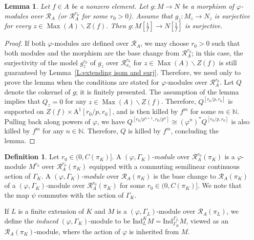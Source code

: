\documentclass[12pt]{article}
\newtheorem{lemma}[theorem]{Lemma}
\theoremstyle{definition}
\newtheorem{defn}[theorem]{Definition}
\numberwithin{equation}{theorem}
\newcommand{\calR}{\mathcal{R}}
\newcommand{\NN}{\mathbb{N}}
\newcommand{\rmA}{\mathrm{A}}
\newcommand{\Ind}{\mathrm{Ind}}
\DeclareMathOperator{\Max}{Max}
\begin{document}
\begin{lemma}
\label{L:local saturation=>global saturation}
Let $f \in A$ be a nonzero element.
Let $g: M \to N$ be a morphism of  $\varphi$-modules over $\calR_A$ (or $\calR_A^{r_0}$ for some $r_0>0$).  Assume that $g_z: M_z \to N_z$ is surjective for every $z \in \Max(A) \backslash Z(f)$.  Then $g:M[\frac 1f] \to N[\frac 1f]$ is surjective.
\end{lemma}
\begin{proof}
If both  $\varphi$-modules are defined over $\calR_A$, we may choose $r_0>0$ such that both modules and the morphism are the base change from $\calR_A^{r_0}$; in this case, the surjectivity of the model $g^{r_0}_z$ of $g_z$ over $\calR^{r_0}_{\kappa_z}$ for $z \in \Max(A)\backslash Z(f)$ is still guaranteed by Lemma~\ref{L:extending isom and surj}.  Therefore, we need only to prove the lemma when the conditions are stated for  $\varphi$-modules over $\calR_A^{r_0}$.
Let $Q$ denote the cokernel of $g$; it is finitely presented.  The assumption of the lemma implies that $Q_z=0$ for any $z \in \Max(A)\backslash Z(f)$. Therefore, $Q^{[r_0/p,r_0]}$ is supported on $Z(f) \times \rmA^1[r_0/p,r_0]$, and  is then killed by $f^m$ for some $m\in \NN$.  Pulling back along powers of $\varphi$, we have $Q^{[r_0/p^{n+1}, r_0/p^n]} \cong (\varphi^n)^* Q^{[r_0/p,r_0]}$ is also killed by $f^m$ for any $n \in \NN$.  Therefore, $Q$ is killed by $f^m$, concluding the lemma.
\end{proof}



\begin{defn}\label{D:phigammamodule}
Let $r_0 \in (0, C(\pi_K)]$.  A \emph{$(\varphi, \Gamma_K)$-module}
  over $\calR_A^{r_0}(\pi_K)$ is a $\varphi$-module $M^{r_0}$ over
  $\calR_A^{r_0}(\pi_K)$ equipped with a commuting semilinear
  continuous action of $\Gamma_K$.  A \emph{$(\varphi,
    \Gamma_K)$-module} over $\calR_A(\pi_K)$ is the base change to
  $\calR_A(\pi_K)$ of a $(\varphi, \Gamma_K)$-module over
  $\calR_A^{r_0}(\pi_K)$ for some $r_0 \in (0, C(\pi_K)]$.  We note
    that the map $\psi$ commutes with the action of $\Gamma_K$.

If $L$ is a finite extension of $K$ and $M$ is a $(\varphi,
\Gamma_L)$-module over $\calR_A(\pi_L)$, we define the \emph{induced}
$(\varphi, \Gamma_K)$-module to be $\Ind_L^K M =
\Ind_{\Gamma_K}^{\Gamma_L}M$, viewed as an $\calR_A(\pi_K)$-module,
where the action of $\varphi$ is inherited from $M$.
\end{defn}
\end{document}
